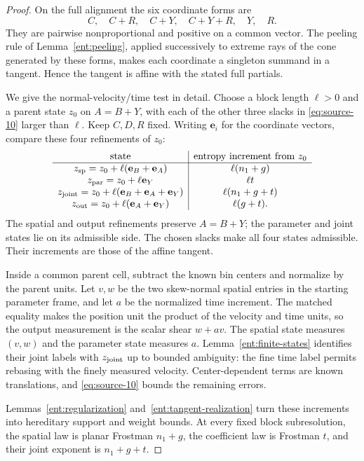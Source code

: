 \begin{proof}
On the full alignment the six coordinate forms are
\[
 C,\quad C+R,\quad C+Y,\quad C+Y+R,\quad Y,\quad R.
\]
They are pairwise nonproportional and positive on a common vector.
The peeling rule of Lemma~\ref{ent:peeling}, applied successively to
extreme rays of the cone generated by these forms, makes each
coordinate a singleton summand in a tangent. Hence the tangent is
affine with the stated full partials.

We give the normal-velocity/time test in detail. Choose a block length
$\ell>0$ and a parent state $z_0$ on $A=B+Y$, with each of the
other three slacks in \eqref{eq:source-10} larger than $\ell$.
Keep $C,D,R$ fixed. Writing $\mathbf e_i$ for the coordinate vectors,
compare these four refinements of $z_0$:
\[
\begin{array}{c|c}
 \text{state}&\text{entropy increment from }z_0\\ \hline
 z_{\rm sp}=z_0+\ell(\mathbf e_B+\mathbf e_A)&\ell(n_1+g)\\
 z_{\rm par}=z_0+\ell\mathbf e_Y&\ell t\\
 z_{\rm joint}=z_0+\ell(\mathbf e_B+\mathbf e_A+\mathbf e_Y)
      &\ell(n_1+g+t)\\
 z_{\rm out}=z_0+\ell(\mathbf e_A+\mathbf e_Y)&\ell(g+t).
\end{array}
\]
The spatial and output refinements preserve $A=B+Y$; the parameter
and joint states lie on its admissible side. The chosen slacks make
all four states admissible. Their increments are those of the affine
tangent.

Inside a common parent cell, subtract the known bin centers and
normalize by the parent units. Let $v,w$ be the two skew-normal
spatial entries in the starting parameter frame, and let $a$ be the
normalized time increment. The matched equality makes the position
unit the product of the velocity and time units, so the output
measurement is the scalar shear $w+av$. The spatial state measures
$(v,w)$ and the parameter state measures $a$.
Lemma~\ref{ent:finite-states} identifies their joint labels with
$z_{\rm joint}$ up to bounded ambiguity: the fine time label permits
rebasing with the finely measured velocity. Center-dependent terms
are known translations, and \eqref{eq:source-10} bounds the
remaining errors.

Lemmas~\ref{ent:regularization} and~\ref{ent:tangent-realization}
turn these increments into hereditary support and weight bounds.
At every fixed block subresolution, the spatial law is planar
Frostman $n_1+g$, the coefficient law is Frostman $t$, and their
joint exponent is $n_1+g+t$.


\end{proof}
